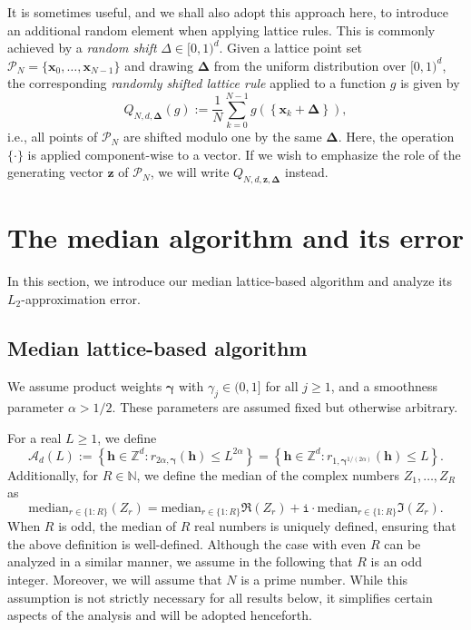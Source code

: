 \documentclass[pdflatex,sn-basic,Numbered]{sn-jnl}%
\newcommand{\bsh}{\boldsymbol{h}}
\newcommand{\bsx}{\boldsymbol{x}}
\newcommand{\bsz}{\boldsymbol{z}}
\newcommand{\bsgamma}{\boldsymbol{\gamma}}
\newcommand{\bsDelta}{\boldsymbol{\Delta}}
\newcommand{\NN}{\mathbb{N}}
\newcommand{\ZZ}{\mathbb{Z}}
\newcommand{\Acal}{\mathcal{A}}
\newcommand{\Pcal}{\mathcal{P}}
\newcommand{\icomp}{\mathtt{i}}
\theoremstyle{thmstyleone}%
\theoremstyle{thmstyletwo}%
\begin{document}
It is sometimes useful, and we shall also adopt this approach here, to introduce an additional random element when applying lattice rules. This is commonly achieved by a \textit{random shift} $\Delta\in [0,1)^d$. Given a lattice point set $\Pcal_N=\{\bsx_0,\ldots,\bsx_{N-1}\}$ and drawing $\bsDelta$ from the uniform distribution over $[0,1)^d$, the corresponding \textit{randomly shifted lattice rule} applied to a function $g$ is given by 
\[
   Q_{N,d,\bsDelta}(g):=\frac{1}{N}\sum_{k=0}^{N-1}g \left(\left\{\bsx_k + \bsDelta\right\}\right),
\]
i.e., all points of $\Pcal_N$ are shifted modulo one by the same $\bsDelta$.
Here, the operation $\{\cdot\}$ is applied component-wise to a vector.
If we wish to emphasize the role of the generating vector $\bsz$ of $\Pcal_N$, we will write $Q_{N,d,\bsz,\bsDelta}$ instead. 


\section{The median algorithm and its error}\label{sec:median}
In this section, we introduce our median lattice-based algorithm and analyze its $L_2$-approximation error. 

\subsection{Median lattice-based algorithm}
We assume product weights $\bsgamma$ with $\gamma_j \in (0,1]$ for all $j\ge 1$, and a smoothness parameter $\alpha>1/2$.
These parameters are assumed fixed but otherwise arbitrary. 

For a real $L\ge 1$, we define
\[
\Acal_d(L) := \left\{ \bsh \in \ZZ^d : r_{2\alpha, \bsgamma}(\bsh) \leq L^{2\alpha} \right\}=\left\{ \bsh \in \ZZ^d : r_{1, \bsgamma^{1/(2\alpha)}}(\bsh) \leq L\right\}.
\]
Additionally, for $R\in\NN$, we define the median of the complex numbers $Z_1,\dots,Z_R$ as
\[ 
\mathrm{median}_{r\in\{1{:}R\}}(Z_r)=\mathrm{median}_{r\in\{1{:}R\}} \Re(Z_r) + \icomp\cdot \mathrm{median}_{r\in\{1{:}R\}} \Im (Z_r). 
\]
When $R$ is odd, the median of $R$ real numbers is uniquely defined, ensuring that the above definition is well-defined. Although the case with even $R$ can be analyzed in a similar manner, we assume in the following that $R$ is an odd integer. Moreover, we will assume that $N$ is a prime 
number. While this assumption is not strictly necessary for all results below, it simplifies certain aspects of the analysis and will be adopted henceforth.
\end{document}
